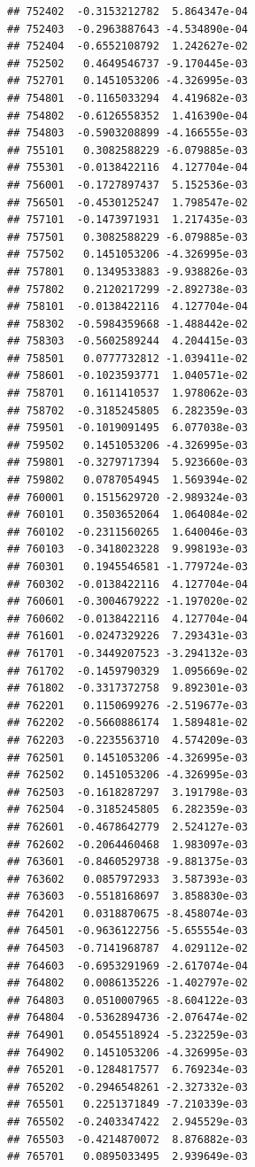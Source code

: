 \begin{frame}[fragile]
\begin{verbatim}
## 752402  -0.3153212782  5.864347e-04
## 752403  -0.2963887643 -4.534890e-04
## 752404  -0.6552108792  1.242627e-02
## 752502   0.4649546737 -9.170445e-03
## 752701   0.1451053206 -4.326995e-03
## 754801  -0.1165033294  4.419682e-03
## 754802  -0.6126558352  1.416390e-04
## 754803  -0.5903208899 -4.166555e-03
## 755101   0.3082588229 -6.079885e-03
## 755301  -0.0138422116  4.127704e-04
## 756001  -0.1727897437  5.152536e-03
## 756501  -0.4530125247  1.798547e-02
## 757101  -0.1473971931  1.217435e-03
## 757501   0.3082588229 -6.079885e-03
## 757502   0.1451053206 -4.326995e-03
## 757801   0.1349533883 -9.938826e-03
## 757802   0.2120217299 -2.892738e-03
## 758101  -0.0138422116  4.127704e-04
## 758302  -0.5984359668 -1.488442e-02
## 758303  -0.5602589244  4.204415e-03
## 758501   0.0777732812 -1.039411e-02
## 758601  -0.1023593771  1.040571e-02
## 758701   0.1611410537  1.978062e-03
## 758702  -0.3185245805  6.282359e-03
## 759501  -0.1019091495  6.077038e-03
## 759502   0.1451053206 -4.326995e-03
## 759801  -0.3279717394  5.923660e-03
## 759802   0.0787054945  1.569394e-02
## 760001   0.1515629720 -2.989324e-03
## 760101   0.3503652064  1.064084e-02
## 760102  -0.2311560265  1.640046e-03
## 760103  -0.3418023228  9.998193e-03
## 760301   0.1945546581 -1.779724e-03
## 760302  -0.0138422116  4.127704e-04
## 760601  -0.3004679222 -1.197020e-02
## 760602  -0.0138422116  4.127704e-04
## 761601  -0.0247329226  7.293431e-03
## 761701  -0.3449207523 -3.294132e-03
## 761702  -0.1459790329  1.095669e-02
## 761802  -0.3317372758  9.892301e-03
## 762201   0.1150699276 -2.519677e-03
## 762202  -0.5660886174  1.589481e-02
## 762203  -0.2235563710  4.574209e-03
## 762501   0.1451053206 -4.326995e-03
## 762502   0.1451053206 -4.326995e-03
## 762503  -0.1618287297  3.191798e-03
## 762504  -0.3185245805  6.282359e-03
## 762601  -0.4678642779  2.524127e-03
## 762602  -0.2064460468  1.983097e-03
## 763601  -0.8460529738 -9.881375e-03
## 763602   0.0857972933  3.587393e-03
## 763603  -0.5518168697  3.858830e-03
## 764201   0.0318870675 -8.458074e-03
## 764501  -0.9636122756 -5.655554e-03
## 764503  -0.7141968787  4.029112e-02
## 764603  -0.6953291969 -2.617074e-04
## 764802   0.0086135226 -1.402797e-02
## 764803   0.0510007965 -8.604122e-03
## 764804  -0.5362894736 -2.076474e-02
## 764901   0.0545518924 -5.232259e-03
## 764902   0.1451053206 -4.326995e-03
## 765201  -0.1284817577  6.769234e-03
## 765202  -0.2946548261 -2.327332e-03
## 765501   0.2251371849 -7.210339e-03
## 765502  -0.2403347422  2.945529e-03
## 765503  -0.4214870072  8.876882e-03
## 765701   0.0895033495  2.939649e-03

\end{verbatim}
\end{frame}
